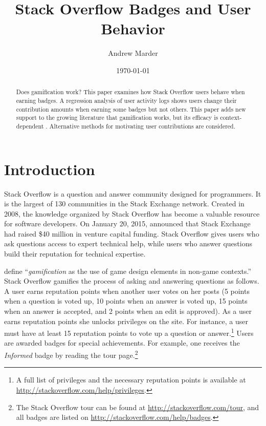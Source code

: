 \documentclass{article}
\title{
  Stack Overflow Badges and User Behavior
}
\author{
  Andrew Marder
}
\date{\today}
\newcommand{\1}{\mathds{1}}
\begin{document}
\maketitle

\begin{abstract}
Does gamification work? This paper examines how Stack Overflow users behave when earning badges. A regression analysis of user activity logs shows users change their contribution amounts when earning some badges but not others. This paper adds new support to the growing literature that gamification works, but its efficacy is context-dependent \citep{Hamari}. Alternative methods for motivating user contributions are considered.
\end{abstract}

\section{Introduction}

Stack Overflow is a question and answer community designed for programmers. It is the largest of 130 communities in the Stack Exchange network. Created in 2008, the knowledge organized by Stack Overflow has become a valuable resource for software developers. On January 20, 2015, \citet{Spoelsky2015} announced that Stack Exchange had raised \$40 million in venture capital funding. Stack Overflow gives users who ask questions access to expert technical help, while users who answer questions build their reputation for technical expertise.

\citet{Deterding2011} define ``\textit{gamification} as the use of game design elements in non-game contexts.'' Stack Overflow gamifies the process of asking and answering questions as follows. A user earns reputation points when another user votes on her posts (5 points when a question is voted up, 10 points when an answer is voted up, 15 points when an answer is accepted, and 2 points when an edit is approved). As a user earns reputation points she unlocks privileges on the site. For instance, a user must have at least 15 reputation points to vote up a question or answer.\footnote{A full list of privileges and the necessary reputation points is available at \url{http://stackoverflow.com/help/privileges}.} Users are awarded badges for special achievements. For example, one receives the \textit{Informed} badge by reading the tour page.\footnote{The Stack Overflow tour can be found at \url{http://stackoverflow.com/tour}, and all badges are listed on \url{http://stackoverflow.com/help/badges}.}
\end{document}
